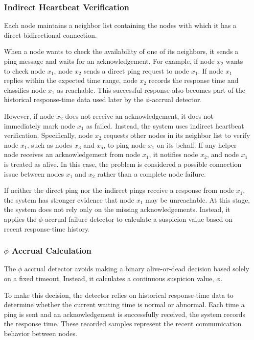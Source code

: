 \subsubsection{Indirect Heartbeat Verification}
\label{subsubsec:indirect_heartbeat_verification}

Each node maintains a neighbor list containing the nodes with which it has a direct bidirectional connection.

When a node wants to check the availability of one of its neighbors, it sends a ping message and waits for an
acknowledgement. For example, if node $x_2$ wants to check node $x_1$, node $x_2$ sends a direct ping request to node
$x_1$. If node $x_1$ replies within the expected time range, node $x_2$ records the response time and classifies node
$x_1$ as reachable. This successful response also becomes part of the historical response-time data used later by the
$\phi$-accrual detector.

However, if node $x_2$ does not receive an acknowledgement, it does not immediately mark node $x_1$ as failed. Instead,
the system uses indirect heartbeat verification. Specifically, node $x_2$ requests other nodes in its neighbor list to
verify node $x_1$, such as nodes $x_3$ and $x_5$, to ping node $x_1$ on its behalf. If any helper node receives an
acknowledgement from node $x_1$, it notifies node $x_2$, and node $x_1$ is treated as alive. In this case, the problem
is considered a possible connection issue between nodes $x_1$ and $x_2$ rather than a complete node failure.

If neither the direct ping nor the indirect pings receive a response from node $x_1$, the system has stronger evidence
that node $x_1$ may be unreachable. At this stage, the system does not rely only on the missing acknowledgements.
Instead, it applies the $\phi$-accrual failure detector to calculate a suspicion value based on recent response-time
history.

\subsubsection{\texorpdfstring{$\phi$}{phi} Accrual Calculation}
\label{subsubsec:phi_accrual_calculation}

The $\phi$ accrual detector avoids making a binary alive-or-dead decision based solely on a fixed timeout. Instead, it
calculates a continuous suspicion value, $\phi$.

To make this decision, the detector relies on historical response-time data to determine whether the current waiting
time is normal or abnormal. Each time a ping is sent and an acknowledgement is successfully received, the system
records the response time. These recorded samples represent the recent communication behavior between nodes.

